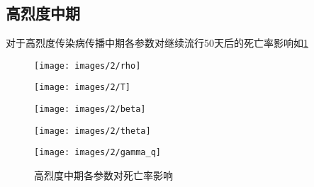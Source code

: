 \documentclass[withoutpreface,bwprint]{cumcmthesis}
\begin{document}
\subsection{高烈度中期}

对于高烈度传染病传播中期各参数对继续流行50天后的死亡率影响如\cref{fig:7}
\begin{figure}[H]
    \centering
    \begin{minipage}[c]{0.3\textwidth}
        \centering
        \texttt{[image: images/2/rho]}
        \subcaption{$\rho$}
    \end{minipage}
    \begin{minipage}[c]{0.3\textwidth}
        \centering
        \texttt{[image: images/2/T]}
    \end{minipage}
    \begin{minipage}[c]{0.3\textwidth}
        \centering
        \texttt{[image: images/2/beta]}
        \subcaption{$\beta$}
    \end{minipage}

    \begin{minipage}[c]{0.3\textwidth}
        \centering
        \texttt{[image: images/2/theta]}
        \subcaption{$\theta$}
    \end{minipage}
    \begin{minipage}[c]{0.3\textwidth}
        \centering
        \texttt{[image: images/2/gamma\_q]}
    \end{minipage}
    \caption{高烈度中期各参数对死亡率影响}
    \label{fig:7}
    
\end{figure}
\end{document}

